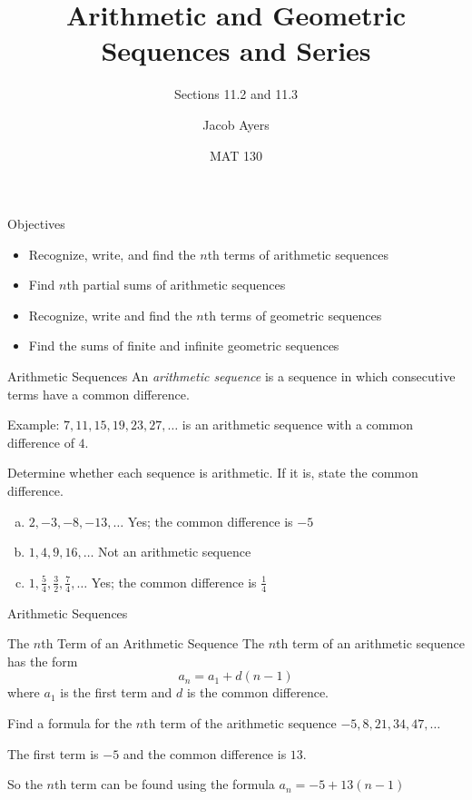 \documentclass[t]{beamer}
\title[Abbr]{Arithmetic and Geometric Sequences and Series}
\subtitle{Sections 11.2 and 11.3}
\author{Jacob Ayers}
\institute{Lesson \#29}
\date{MAT 130}
\begin{document}
	
	\begin{frame}
		\titlepage
	\end{frame}
	
	\begin{frame}{Objectives}
		\begin{itemize}
			\item Recognize, write, and find the $n$th terms of arithmetic sequences
			\item Find $n$th partial sums of arithmetic sequences
			\item Recognize, write and find the $n$th terms of geometric sequences
			\item Find the sums of finite and infinite geometric sequences
		\end{itemize}
	\end{frame}

	\begin{frame}{Arithmetic Sequences}
		An \textit{arithmetic sequence} is a sequence in which consecutive terms have a common difference.
		
		Example: $7, 11, 15, 19, 23, 27, \dots$ is an arithmetic sequence with a common difference of $4$. \pause
		
		Determine whether each sequence is arithmetic. If it is, state the common difference. \begin{enumerate}[a)]
			\item $2, -3, -8, -13, \dots$ \pause {} Yes; the common difference is $-5$ \pause
			\item $1, 4, 9, 16, \dots$ \pause {} Not an arithmetic sequence \pause
			\item $1, \frac54, \frac32, \frac74, \dots$ \pause {} Yes; the common difference is $\frac14$
		\end{enumerate}
	\end{frame}

	\begin{frame}{Arithmetic Sequences}
		\begin{block}{The $n$th Term of an Arithmetic Sequence}
			The $n$th term of an arithmetic sequence has the form $$a_n = a_1 + d(n - 1)$$ where $a_1$ is the first term and $d$ is the common difference.
		\end{block} \pause
	
		Find a formula for the $n$th term of the arithmetic sequence $-5, 8, 21, 34, 47, \dots$ \pause
		
		The first term is $-5$ and the common difference is $13$. \pause 
		
		So the $n$th term can be found using the formula $a_n = -5 + 13(n-1)$
	\end{frame}
\end{document}
